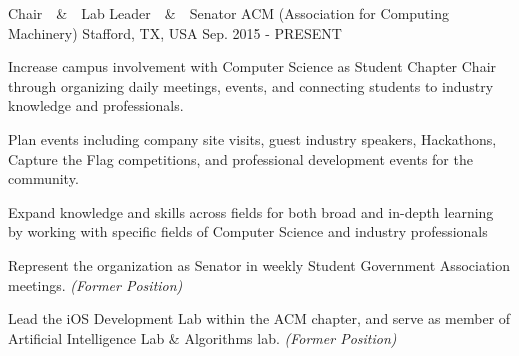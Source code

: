 \begin{cventries}
  \cventry
  	{Chair~~\&~~Lab Leader~~\&~~Senator}
    {ACM (Association for Computing Machinery)}
    {Stafford, TX, USA}
    {Sep. 2015 - PRESENT}
    {
      \begin{cvitems}
        \item {Increase campus involvement with Computer Science as Student Chapter Chair through organizing daily meetings, events, and connecting students to industry knowledge and professionals.}
        \item {Plan events including company site visits, guest industry speakers, Hackathons, Capture the Flag competitions, and professional development events for the community.}
        \item {Expand knowledge and skills across fields for both broad and in-depth learning by working with specific fields of
Computer Science and industry professionals}
		\item{Represent the organization as Senator in weekly Student Government Association meetings. \textit{(Former Position)}}
       	\item{ Lead the iOS Development Lab within the ACM chapter, and serve as member of Artificial Intelligence Lab \&
Algorithms lab. \textit{(Former Position)}}
      \end{cvitems}
    }
    {
    }
\end{cventries}


